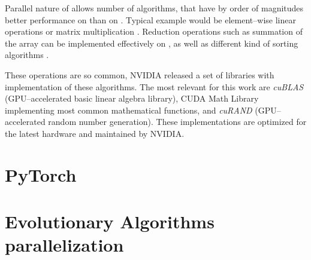 Parallel nature of \cuda allows number of algorithms, that have by order of magnitudes better performance on \gpu than on \cpuns. Typical example would be element--wise linear operations or matrix multiplication \citep{GPUMatrixMultiplication}. Reduction operations such as summation of the array can be implemented effectively on \gpu \citep{harris2007optimizing}, as well as different kind of sorting algorithms \citep{GPUsorting}.

These operations are so common, NVIDIA released a set of libraries with implementation of these algorithms. The most relevant for this work are \textit{cuBLAS} (GPU--accelerated basic linear algebra library), CUDA Math Library implementing most common mathematical functions, and \textit{cuRAND} (GPU--accelerated random number generation). These implementations are optimized for the latest hardware and maintained by NVIDIA.




\section{PyTorch}




\section{Evolutionary Algorithms parallelization}
